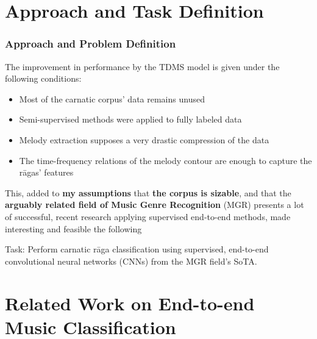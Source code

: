 \documentclass[hyperref={pdfpagelabels=false}]{beamer}
\begin{document}
     \section{Approach and Task Definition}
     \frame{\sectionpage}


     \begin{frame}
       \frametitle{Approach and Problem Definition}
       The improvement in performance by the TDMS model is given under the following conditions:
       \begin{itemize}
       \item Most of the carnatic corpus' data remains unused
       \item Semi-supervised methods were applied to fully labeled data
       \item Melody extraction supposes a very drastic compression of the data
       \item The time-frequency relations of the melody contour are enough to capture the r\=agas' features
       \end{itemize}
       \vspace{5mm}
       This, added to \textbf{my assumptions} that \textbf{the corpus is sizable}\cite[p.iii]{andres-bachelor}, and that the \textbf{arguably related field of Music Genre Recognition}\cite[p.17]{andres-bachelor} (MGR) presents a lot of successful, recent research applying supervised end-to-end methods, made interesting and feasible the following
       \begin{block}{Task:}
         Perform carnatic r\=aga classification using supervised, end-to-end convolutional neural networks (CNNs) from the MGR field's SoTA.
       \end{block}
     \end{frame}



     \section{Related Work on End-to-end Music Classification}
     \frame{\sectionpage}
\end{document}
